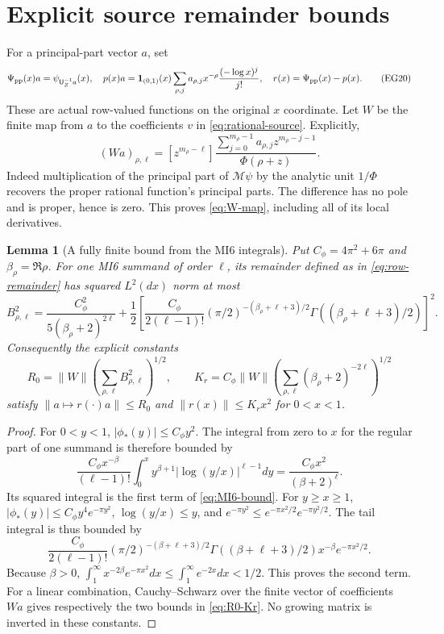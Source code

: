 \documentclass[11pt]{article}
\newtheorem{lemma}[theorem]{Lemma}
\newcommand{\M}{\mathcal M}\newcommand{\G}{\mathsf G}
\newcommand{\U}{\mathsf U}\newcommand{\E}{\mathsf E}
\begin{document}
\section{Explicit source remainder bounds}\label{sec:remainder}
For a principal-part vector $a$, set
\[
 \Psi_{\rm pp}(x)a=\psi_{\U_Z^{-1}a}(x),\quad
 p(x)a=\mathbf1_{(0,1)}(x)\sum_{\rho,j}a_{\rho,j}
                   x^{-\rho}\frac{(-\log x)^j}{j!},\quad
 r(x)=\Psi_{\rm pp}(x)-p(x).
 \tag{EG20}\label{eq:row-remainder}
\]
These are actual row-valued functions on the original $x$ coordinate.
Let $W$ be the finite map from $a$ to the coefficients $v$ in
\eqref{eq:rational-source}. Explicitly,
\[
 (Wa)_{\rho,\ell}=[z^{m_\rho-\ell}]
 \frac{\sum_{j=0}^{m_\rho-1}a_{\rho,j}z^{m_\rho-j-1}}
                  {\Phi(\rho+z)}.
 \tag{EG21}\label{eq:W-map}
\]
Indeed multiplication of the principal part of $\M\psi$ by the
analytic unit $1/\Phi$ recovers the proper rational function's
principal parts. The difference has no pole and is proper, hence is
zero. This proves \eqref{eq:W-map}, including all of its local derivatives.

\begin{lemma}[A fully finite bound from the MI6 integrals]\label{lem:R0}
Put $C_\phi=4\pi^2+6\pi$ and $\beta_\rho=\Re\rho$. For one MI6
summand of order $\ell$, its remainder defined as in
\eqref{eq:row-remainder} has squared $L^2(dx)$ norm at most
\[
 B_{\rho,\ell}^2=
 \frac{C_\phi^2}{5(\beta_\rho+2)^{2\ell}}
 +\frac12\left[
 \frac{C_\phi}{2(\ell-1)!}
 (\pi/2)^{-(\beta_\rho+\ell+3)/2}
 \Gamma((\beta_\rho+\ell+3)/2)\right]^2.
 \tag{EG22}\label{eq:MI6-bound}
\]
Consequently the explicit constants
\[
 R_0=\|W\|\left(\sum_{\rho,\ell}B_{\rho,\ell}^2\right)^{1/2},\qquad
 K_r=C_\phi\|W\|\left(\sum_{\rho,\ell}
                         (\beta_\rho+2)^{-2\ell}\right)^{1/2}
 \tag{EG23}\label{eq:R0-Kr}
\]
satisfy $\|a\mapsto r(\cdot)a\|\le R_0$ and
$\|r(x)\|\le K_rx^2$ for $0<x<1$.
\end{lemma}
\begin{proof}
For $0<y<1$, $|\phi_*(y)|\le C_\phi y^2$. The integral from zero
to $x$ for the regular part of one summand is therefore bounded by
\[
 \frac{C_\phi x^{-\beta}}{(\ell-1)!}
 \int_0^x y^{\beta+1}|\log(y/x)|^{\ell-1}dy
       =\frac{C_\phi x^2}{(\beta+2)^\ell}.
\]
Its squared integral is the first term of \eqref{eq:MI6-bound}.
For $y\ge x\ge1$, $|\phi_*(y)|\le C_\phi y^4e^{-\pi y^2}$,
$\log(y/x)\le y$, and
$e^{-\pi y^2}\le e^{-\pi x^2/2}e^{-\pi y^2/2}$. The tail integral
is thus bounded by
\[
 \frac{C_\phi}{2(\ell-1)!}
 (\pi/2)^{-(\beta+\ell+3)/2}\Gamma((\beta+\ell+3)/2)
                    x^{-\beta}e^{-\pi x^2/2}.
\]
Because $\beta>0$, $\int_1^\infty x^{-2\beta}e^{-\pi x^2}dx
\le\int_1^\infty e^{-2x}dx<1/2$. This proves the second term.
For a linear combination, Cauchy--Schwarz over the finite vector
of coefficients $Wa$ gives respectively the two bounds in
\eqref{eq:R0-Kr}. No growing matrix is inverted in these constants.
\end{proof}
\end{document}
